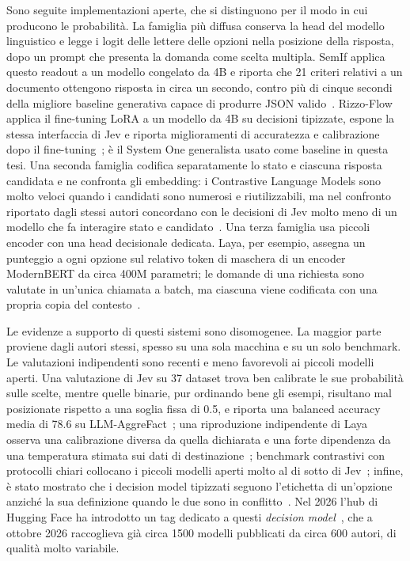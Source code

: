 Sono seguite implementazioni aperte, che si distinguono per il modo in cui producono le probabilità. La famiglia più
diffusa conserva la head del modello linguistico e legge i logit delle lettere delle opzioni nella posizione della
risposta, dopo un prompt che presenta la domanda come scelta multipla. SemIf applica questo readout a un modello
congelato da 4B e riporta che 21 criteri relativi a un documento ottengono risposta in circa un secondo, contro più di
cinque secondi della migliore baseline generativa capace di produrre JSON valido~\cite{semif}. Rizzo-Flow applica il
fine-tuning LoRA a un modello da 4B su decisioni tipizzate, espone la stessa interfaccia di Jev e riporta miglioramenti
di accuratezza e calibrazione dopo il fine-tuning~\cite{rizzoflow}; è il System One generalista usato come baseline in
questa tesi. Una seconda famiglia codifica separatamente lo stato e ciascuna risposta candidata e ne confronta gli
embedding: i Contrastive Language Models sono molto veloci quando i candidati sono numerosi e riutilizzabili, ma nel
confronto riportato dagli stessi autori concordano con le decisioni di Jev molto meno di un modello che fa interagire
stato e candidato~\cite{kwok2026clm}. Una terza famiglia usa piccoli encoder con una head decisionale dedicata. Laya, per
esempio, assegna un punteggio a ogni opzione sul relativo token di maschera di un encoder ModernBERT da circa 400M
parametri; le domande di una richiesta sono valutate in un'unica chiamata a batch, ma ciascuna viene codificata con una
propria copia del contesto~\cite{convai2026laya,azizi2026labels}.

Le evidenze a supporto di questi sistemi sono disomogenee. La maggior parte proviene dagli autori stessi, spesso su una
sola macchina e su un solo benchmark. Le valutazioni indipendenti sono recenti e meno favorevoli ai piccoli modelli
aperti. Una valutazione di Jev su 37 dataset trova ben calibrate le sue probabilità sulle scelte, mentre quelle binarie,
pur ordinando bene gli esempi, risultano mal posizionate rispetto a una soglia fissa di 0.5, e riporta una balanced
accuracy media di 78.6 su LLM-AggreFact~\cite{deusser2026jev}; una riproduzione indipendente di Laya osserva una
calibrazione diversa da quella dichiarata e una forte dipendenza da una temperatura stimata sui dati di
destinazione~\cite{nandakishore2026laya}; benchmark contrastivi con protocolli chiari collocano i piccoli modelli aperti
molto al di sotto di Jev~\cite{yong2026decidebench}; infine, è stato mostrato che i decision model tipizzati seguono
l'etichetta di un'opzione anziché la sua definizione quando le due sono in conflitto~\cite{azizi2026labels}. Nel 2026
l'hub di Hugging Face ha introdotto un tag dedicato a questi \emph{decision model}~\cite{hf2026decisionmodels}, che a
ottobre 2026 raccoglieva già circa 1500 modelli pubblicati da circa 600 autori, di qualità molto variabile.

